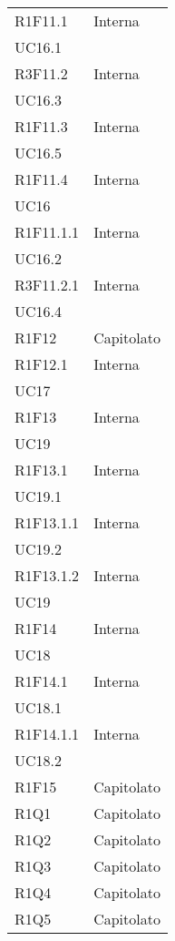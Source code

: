 \begin{longtable}{|C{6.5cm}|C{6.5cm}|}
	R1F11.1 &  \centering Interna \\ UC16.1 \tabularnewline
	
	R3F11.2 & \centering Interna \\ UC16.3 \tabularnewline
	
	R1F11.3 & \centering Interna \\ UC16.5 \tabularnewline
	
	R1F11.4 & \centering Interna \\ UC16 \tabularnewline
	
	R1F11.1.1 & \centering Interna \\ UC16.2 \tabularnewline
	
	R3F11.2.1 & \centering Interna \\ UC16.4 \tabularnewline
	
	R1F12 &   Capitolato \\
	
	R1F12.1 & \centering Interna \\ UC17 \tabularnewline
	
	R1F13 & \centering Interna \\ UC19 \tabularnewline
	
	R1F13.1 & \centering Interna \\ UC19.1 \tabularnewline
	
	R1F13.1.1 & \centering Interna \\ UC19.2 \tabularnewline
	
	R1F13.1.2 & \centering Interna \\ UC19 \tabularnewline
	
	R1F14 & \centering Interna \\ UC18 \tabularnewline
	
	R1F14.1 & \centering Interna \\ UC18.1 \tabularnewline
	
	R1F14.1.1 &\centering Interna \\ UC18.2 \tabularnewline
	
	R1F15 & Capitolato \\
	
	R1Q1 & Capitolato \\
	
	R1Q2 & Capitolato \\
	
	R1Q3 & Capitolato \\
		
	R1Q4 & Capitolato \\
			
	R1Q5 & Capitolato \\
				

\end{longtable}
